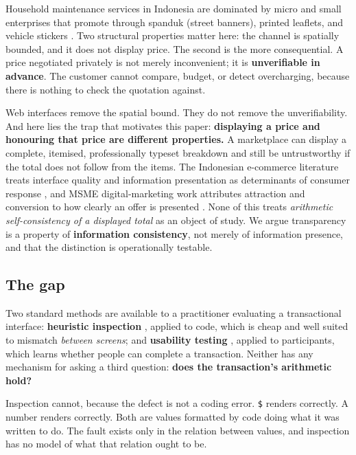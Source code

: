 \documentclass[conference]{IEEEtran}
\begin{document}
Household maintenance services in Indonesia are dominated by micro and small enterprises that promote
through spanduk (street banners), printed leaflets, and vehicle stickers \cite{tianti2024}. Two
structural properties matter here: the channel is spatially bounded, and it does not display price.
The second is the more consequential. A price negotiated privately is not merely inconvenient; it is
\textbf{unverifiable in advance}. The customer cannot compare, budget, or detect overcharging, because
there is nothing to check the quotation against.

Web interfaces remove the spatial bound. They do not remove the unverifiability. And here lies the trap
that motivates this paper: \textbf{displaying a price and honouring that price are different
properties.} A marketplace can display a complete, itemised, professionally typeset breakdown and still
be untrustworthy if the total does not follow from the items. The Indonesian e-commerce literature
treats interface quality and information presentation as determinants of consumer response
\cite{dinata2023,sunarso2023}, and MSME digital-marketing work attributes attraction and conversion to
how clearly an offer is presented \cite{tianti2024,sunarso2023}. None of this treats \emph{arithmetic
self-consistency of a displayed total} as an object of study. We argue transparency is a property of
\textbf{information consistency}, not merely of information presence, and that the distinction is
operationally testable.

\subsection{The gap}

Two standard methods are available to a practitioner evaluating a transactional interface:
\textbf{heuristic inspection} \cite{nielsen1994}, applied to code, which is cheap and well suited to
mismatch \emph{between screens}; and \textbf{usability testing} \cite{sauro2016}, applied to
participants, which learns whether people can complete a transaction. Neither has any mechanism for
asking a third question: \textbf{does the transaction's arithmetic hold?}

Inspection cannot, because the defect is not a coding error. \texttt{\$} renders correctly. A number
renders correctly. Both are values formatted by code doing what it was written to do. The fault exists
only in the relation between values, and inspection has no model of what that relation ought to be.
\end{document}
